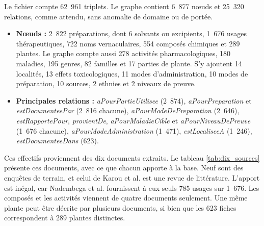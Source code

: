 Le fichier compte 62~961 triplets. Le graphe contient 6~877 nœuds et 25~320 relations, comme attendu, sans anomalie de domaine ou de portée.

\begin{itemize}
    \item \textbf{Nœuds :} 2~822 préparations, dont 6 solvants ou excipients, 1~676 usages thérapeutiques, 722 noms vernaculaires, 554 composés chimiques et 289 plantes. Le graphe compte aussi 278 activités pharmacologiques, 180 maladies, 195 genres, 82 familles et 17 parties de plante. S'y ajoutent 14 localités, 13 effets toxicologiques, 11 modes d'administration, 10 modes de préparation, 10 sources, 2 ethnies et 2 niveaux de preuve.
    \item \textbf{Principales relations :} \textit{aPourPartieUtilisee} (2~874), \textit{aPourPreparation} et \textit{estDocumenteePar} (2~816 chacune), \textit{aPourModeDePreparation} (2~646), \textit{estRapportePour}, \textit{provientDe}, \textit{aPourMaladieCible} et \textit{aPourNiveauDePreuve} (1~676 chacune), \textit{aPourModeAdministration} (1~471), \textit{estLocaliseeA} (1~246), \textit{estDocumenteeDans} (623).
\end{itemize}

Ces effectifs proviennent des dix documents extraits. Le tableau \ref{tab:dix_sources} présente ces documents, avec ce que chacun apporte à la base. Neuf sont des enquêtes de terrain, et celui de Karou et al. est une revue de littérature. L'apport est inégal, car Nadembega et al. fournissent à eux seuls 785 usages sur 1~676. Les composés et les activités viennent de quatre documents seulement. Une même plante peut être décrite par plusieurs documents, si bien que les 623 fiches correspondent à 289 plantes distinctes.

